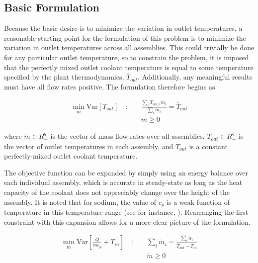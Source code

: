 \documentclass[11pt, oneside]{article}   	%
\newcommand{\Var}{\mathrm{Var}}
\begin{document}
\subsection{Basic Formulation}

Because the basic desire is to minimize the variation in outlet temperatures, a reasonable starting point for the formulation of this problem is to minimize the variation in outlet temperatures across all assemblies.
This could trivially be done for any particular outlet temperature, so to constrain the problem, it is imposed that the perfectly mixed outlet coolant temperature is equal to some temperature specified by the plant thermodynamics, $\bar{T}_{out}$.
Additionally, any meaningful results must have all flow rates positive.
The formulation therefore begins as:

\begin{align}
\min_{\dot{m}} \Var [T_{out}] \quad : \quad & \frac{\sum_i T_{out,i} \dot{m}_i}{\sum_i \dot{m}_i} = \bar{T}_{out} \\
& \dot{m} \geq 0 \nonumber
\end{align}

where $\dot{m} \in R^q_+$ is the vector of mass flow rates over all assemblies, $T_{out} \in R^q_+$ is the vector of outlet temperatures in each assembly, and $\bar{T}_{out}$ is a constant perfectly-mixed outlet coolant temperature.

The objective function can be expanded by simply using an energy balance over each individual assembly, which is accurate in steady-state as long as the heat capacity of the coolant does not appreciably change over the height of the assembly.
It is noted that for sodium, the value of $c_p$ is a weak function of temperature in this temperature range (see for instance, \cite{SAS_sodiumCorrelations}).
Rearranging the first constraint with this expansion allows for a more clear picture of the formulation.

\begin{align} 
\min_{\dot{m}} \Var [\frac{\dot{Q}}{\dot{m}c_p} + T_{in}] \quad : \quad & \sum_i \dot{m}_i = \frac{\sum_i \alpha_i}{\bar{T}_{out}-T_{in}}  \label{eq:nonConvexVersion} \\ 
& \dot{m} \geq 0 \nonumber
\end{align}
\end{document}
